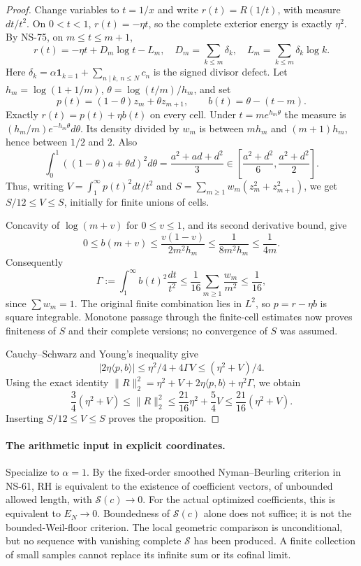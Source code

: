 \documentclass[11pt]{article}
\theoremstyle{remark}
\begin{document}
\begin{proof}
Change variables to $t=1/x$ and write $r(t)=R(1/t)$, with measure
$dt/t^2$. On $0<t<1$, $r(t)=-\eta t$, so the complete exterior
energy is exactly $\eta^2$. By NS-75, on $m\leq t\leq m+1$,
\[
 r(t)=-\eta t+D_m\log t-L_m,
\quad D_m=\sum_{k\leq m}\delta_k,
\quad L_m=\sum_{k\leq m}\delta_k\log k.
\]
Here $\delta_k=\alpha\mathbf1_{k=1}+\sum_{n\mid k,\,n\leq N}c_n$
is the signed divisor defect.
Let $h_m=\log(1+1/m)$, $\theta=\log(t/m)/h_m$, and set
\[
 p(t)=(1-\theta)z_m+\theta z_{m+1},\qquad
 b(t)=\theta-(t-m).
\]
Exactly $r(t)=p(t)+\eta b(t)$ on every cell.
Under $t=m e^{h_m\theta}$ the measure is
$(h_m/m)e^{-h_m\theta}d\theta$. Its density divided by $w_m$
is between $m h_m$ and $(m+1)h_m$, hence between $1/2$ and $2$.
Also
\[
 \int_0^1((1-\theta)a+\theta d)^2d\theta
       =\frac{a^2+ad+d^2}{3}
       \in\left[\frac{a^2+d^2}{6},\frac{a^2+d^2}{2}\right].
\]
Thus, writing $V=\int_1^\infty p(t)^2dt/t^2$ and
$S=\sum_{m\geq1}w_m(z_m^2+z_{m+1}^2)$, we get
$S/12\leq V\leq S$, initially for finite unions of cells.

Concavity of $\log(m+v)$ for $0\leq v\leq1$, and its second
derivative bound, give
\[
 0\leq b(m+v)\leq\frac{v(1-v)}{2m^2h_m}
       \leq\frac1{8m^2h_m}\leq\frac1{4m}.
\]
Consequently
\[
 \Gamma:=\int_1^\infty b(t)^2\frac{dt}{t^2}
 \leq\frac1{16}\sum_{m\geq1}\frac{w_m}{m^2}
 \leq\frac1{16},
\]
since $\sum w_m=1$. The original finite combination lies in $L^2$,
so $p=r-\eta b$ is square integrable. Monotone passage through the
finite-cell estimates now proves finiteness of $S$ and their complete
versions; no convergence of $S$ was assumed.

Cauchy--Schwarz and Young's inequality give
\[
 |2\eta\langle p,b\rangle|
       \leq\eta^2/4+4\Gamma V\leq(\eta^2+V)/4.
\]
Using the exact identity
$\|R\|_2^2=\eta^2+V+2\eta\langle p,b\rangle+\eta^2\Gamma$,
we obtain
\[
 \frac34(\eta^2+V)\leq\|R\|_2^2
 \leq\frac{21}{16}\eta^2+\frac54V
 \leq\frac{21}{16}(\eta^2+V).
\]
Inserting $S/12\leq V\leq S$ proves the proposition.
\end{proof}

\paragraph{The arithmetic input in explicit coordinates.}
Specialize to $\alpha=1$. By the fixed-order smoothed Nyman--Beurling
criterion in NS-61, RH is
equivalent to the existence of coefficient vectors, of unbounded allowed
length, with $\mathcal S(c)\to0$. For the actual optimized coefficients,
this is equivalent to $E_N\to0$. Boundedness of $\mathcal S(c)$ alone
does not suffice; it is not the bounded-Weil-floor criterion.
The local geometric comparison is unconditional, but no sequence with
vanishing complete $\mathcal S$ has been produced. A finite collection
of small samples cannot replace its infinite sum or its cofinal limit.
\end{document}

